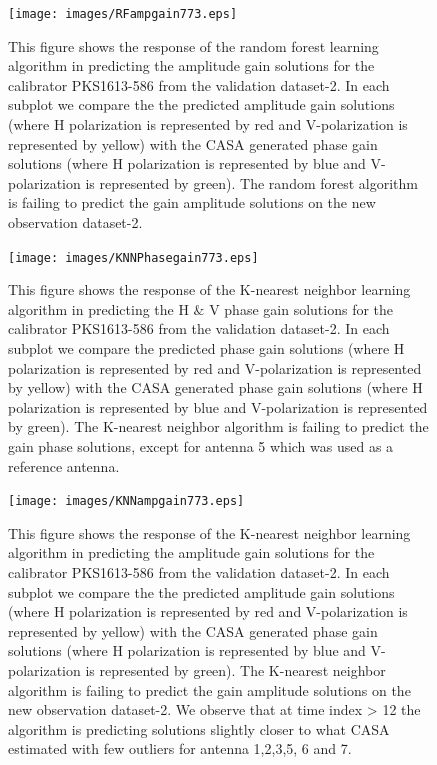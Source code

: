 \begin{figure}[H]
    \texttt{[image: images/RFampgain773.eps]}
    \caption{This figure shows the response of the random forest learning algorithm in predicting the amplitude gain solutions for the calibrator PKS1613-586 from the validation dataset-2. In each subplot we compare the the predicted amplitude gain solutions (where H polarization is represented by red and V-polarization is represented by yellow) with the CASA generated phase gain solutions (where H polarization is represented by blue and V-polarization is represented by green). The random forest algorithm is failing to predict the gain amplitude solutions on the new observation dataset-2.}
     \label{ra3}
\end{figure}

\begin{figure}[H]
    \texttt{[image: images/KNNPhasegain773.eps]}
    \caption{This figure shows the response of the K-nearest neighbor learning algorithm in predicting the H $\&$ V phase gain solutions for the calibrator PKS1613-586 from the validation dataset-2. In each subplot we compare the predicted phase gain solutions (where H polarization is represented by red and V-polarization is represented by yellow) with the CASA generated phase gain solutions (where H polarization is represented by blue and V-polarization is represented by green). The K-nearest neighbor algorithm is failing to predict the gain phase solutions, except for antenna 5 which was used as a reference antenna.}
    \label{obs11}
\end{figure}

\begin{figure}[H]
    \texttt{[image: images/KNNampgain773.eps]}
    \caption{This figure shows the response of the K-nearest neighbor learning algorithm in predicting the amplitude gain solutions for the calibrator PKS1613-586 from the validation dataset-2. In each subplot we compare the the predicted amplitude gain solutions (where H polarization is represented by red and V-polarization is represented by yellow) with the CASA generated phase gain solutions (where H polarization is represented by blue and V-polarization is represented by green). The K-nearest neighbor algorithm is failing to predict the gain amplitude solutions on the new observation dataset-2. We observe that at time index > 12 the algorithm is predicting solutions slightly  closer to what CASA estimated with few outliers for antenna 1,2,3,5, 6 and 7.}
     \label{ka3}
\end{figure}


